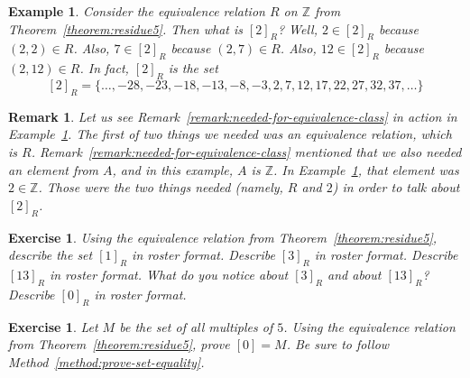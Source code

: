 \documentclass{book}
\newcounter{ekcounter}%
\theoremstyle{ekimcustom}
\newtheorem{example}[ekcounter]{Example}
\newtheorem{exercise}[ekcounter]{Exercise}
\newtheorem{remark}[ekcounter]{Remark}
\begin{document}
\begin{example}\label{example:residue5equivalence-classes}
Consider the equivalence relation $R$ on $\mathbb{Z}$ from Theorem~\ref{theorem:residue5}. Then what is $[2]_R$?
Well, $2 \in [2]_R$ because $(2,2) \in R$.
Also, $7 \in [2]_R$ because $(2,7) \in R$.
Also, $12 \in [2]_R$ because $(2,12) \in R$.
In fact, $[2]_R$ is the set
\[ [2]_R = \{\dots,-28,-23,-18,-13,-8,-3,2,7,12,17,22,27,32,37,\dots\} \]
\end{example}
\begin{remark}
Let us see Remark~\ref{remark:needed-for-equivalence-class} in action in Example~\ref{example:residue5equivalence-classes}. The first of two things we needed was an equivalence relation, which is $R$. Remark~\ref{remark:needed-for-equivalence-class} mentioned that we also needed an element from $A$, and in this example, $A$ is $\mathbb{Z}$. In Example~\ref{example:residue5equivalence-classes}, that element was $2 \in \mathbb{Z}$. Those were the two things needed (namely, $R$ and $2$) in order to talk about $[2]_R$.
\end{remark}

\begin{exercise}
Using the equivalence relation from Theorem~\ref{theorem:residue5}, describe the set $[1]_R$ in roster format. Describe $[3]_R$ in roster format. Describe $[13]_R$ in roster format. What do you notice about $[3]_R$ and about $[13]_R$? Describe $[0]_R$ in roster format.
\end{exercise}
\begin{exercise}
Let $M$ be the set of all multiples of $5$. Using the equivalence relation from Theorem~\ref{theorem:residue5}, prove $[0] = M$. Be sure to follow Method~\ref{method:prove-set-equality}.
\end{exercise}
\end{document}
